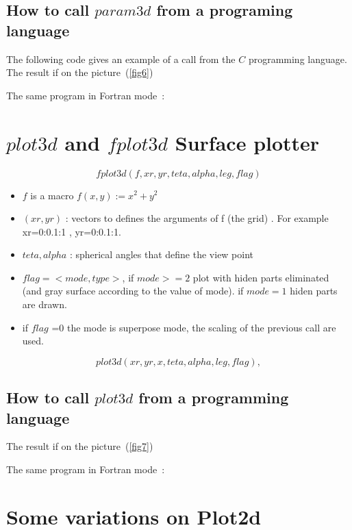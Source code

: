 \subsection{How to call $param3d$ from a programing language}
The following code 
 gives an example of a call from the $C$ programming language. The result 
 if on the picture~(\ref{fig6})
 

The same program in Fortran mode~:

 

\section{ $plot3d$ and $fplot3d$ Surface plotter}


\[
fplot3d(f,xr,yr,teta,alpha,leg,flag)
\]
\begin{itemize}
  \item $f$  is a macro $f(x,y):=x^2+y^2$
  \item $(xr,yr)$ : vectors to defines the arguments of f (the grid)
  . For example  xr=0:0.1:1 , yr=0:0.1:1.
\item $teta, alpha$ : spherical angles that define the view point
\item $ flag=<mode,type>$, if $mode >=2$ plot with hiden parts eliminated 
	(and gray surface according to the value of mode). if 
    $mode = 1$ hiden parts are drawn.
\item if $flag$ =0 the mode is superpose mode, the scaling of the previous 
 call are used. 
\end{itemize}
\[
plot3d(xr,yr,x,teta,alpha,leg,flag),
\]

\subsection{How to call $plot3d$ from a programming language}
The result 
 if on the picture~(\ref{fig7})

 

The same program in Fortran mode~:

 

\section{Some variations on Plot2d}
 
 
 

